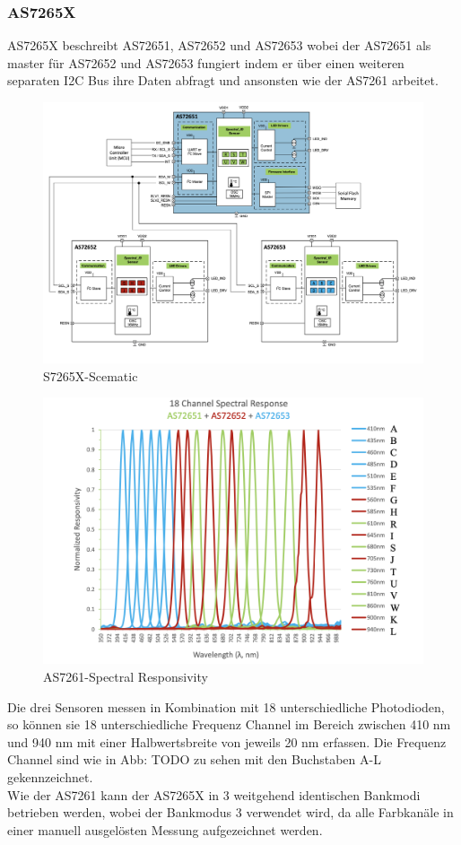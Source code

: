 \subsubsection{AS7265X}\label{AS7265X}
AS7265X beschreibt AS72651, AS72652 und AS72653 wobei der AS72651 als master für AS72652 und AS72653 fungiert indem er über einen weiteren separaten I2C Bus ihre Daten abfragt und ansonsten wie der AS7261 arbeitet.

\begin{figure}[H]
  \centering
 \includegraphics[width=0.9\linewidth]{img/AS7265X-Scematic.png}
  \caption{S7265X-Scematic}
  \label{fig:S7265X-Scematic}
\end{figure}


\begin{figure}[H]
  \centering
 \includegraphics[width=0.9\linewidth]{img/AS7265X-Spectral_Responsivity.png}
  \caption{AS7261-Spectral Responsivity}
  \label{fig:AS7261-Spectral_Responsivity}
\end{figure}
Die drei Sensoren messen in Kombination mit 18 unterschiedliche Photodioden, so können sie 18 unterschiedliche Frequenz Channel im Bereich zwischen 410 nm und 940 nm mit einer Halbwertsbreite von jeweils 20 nm erfassen.
Die Frequenz Channel sind wie in Abb: TODO zu sehen mit den Buchstaben A-L gekennzeichnet.\\
Wie der AS7261 kann der AS7265X in 3 weitgehend identischen Bankmodi betrieben werden, wobei der Bankmodus 3 verwendet wird, da alle Farbkanäle in einer manuell ausgelösten Messung aufgezeichnet werden.

